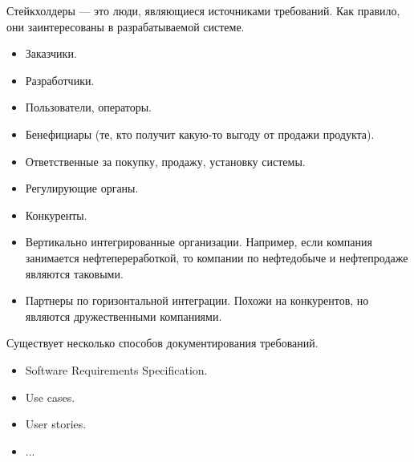     \begin{Def}[Стейкхолдеры]
        Стейкхолдеры --- это люди, являющиеся источниками требований. Как правило, они заинтересованы в разрабатываемой системе.
        \begin{itemize}
            \item Заказчики.
            \item Разработчики.
            \item Пользователи, операторы.
            \item Бенефициары (те, кто получит какую-то выгоду от продажи продукта).
            \item Ответственные за покупку, продажу, установку системы.
            \item Регулирующие органы.
            \item Конкуренты.
            \item Вертикально интегрированные организации. Например, если компания занимается нефтепереработкой, то компании по нефтедобыче и нефтепродаже являются таковыми.
            \item Партнеры по горизонтальной интеграции. Похожи на конкурентов, но являются дружественными компаниями.
        \end{itemize}
    \end{Def}

    \begin{Rem}
        Существует несколько способов документирования требований.
        \begin{itemize}
            \item Software Requirements Specification.
            \item Use cases.
            \item User stories.
            \item ...
        \end{itemize}
    \end{Rem}


    
    


